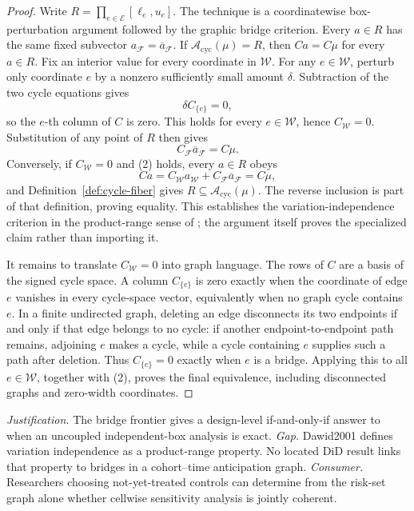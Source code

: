 \documentclass{article}
\begin{document}
\begin{proof}
Write \(R=\prod_{e\in\mathcal E}[\ell_e,u_e]\).  The technique is a coordinatewise box-perturbation argument followed by the graphic bridge criterion.  Every \(a\in R\) has the same fixed subvector \(a_{\mathcal F}=\overline a_{\mathcal F}\).  If \(\mathcal A_{\mathrm{cyc}}(\mu)=R\), then \(Ca=C\mu\) for every \(a\in R\).  Fix an interior value for every coordinate in \(\mathcal W\).  For any \(e\in\mathcal W\), perturb only coordinate \(e\) by a nonzero sufficiently small amount \(\delta\).  Subtraction of the two cycle equations gives
\[
 \delta C_{\{e\}}=0,
\]
so the \(e\)-th column of \(C\) is zero.  This holds for every \(e\in\mathcal W\), hence \(C_{\mathcal W}=0\).  Substitution of any point of \(R\) then gives
\[
 C_{\mathcal F}\overline a_{\mathcal F}=C\mu. \tag{2}
\]
Conversely, if \(C_{\mathcal W}=0\) and (2) holds, every \(a\in R\) obeys
\[
 Ca=C_{\mathcal W}a_{\mathcal W}+C_{\mathcal F}\overline a_{\mathcal F}=C\mu,
\]
and Definition~\ref{def:cycle-fiber} gives \(R\subseteq\mathcal A_{\mathrm{cyc}}(\mu)\).  The reverse inclusion is part of that definition, proving equality.  This establishes the variation-independence criterion in the product-range sense of \cite{Dawid2001}; the argument itself proves the specialized claim rather than importing it.

It remains to translate \(C_{\mathcal W}=0\) into graph language.  The rows of \(C\) are a basis of the signed cycle space.  A column \(C_{\{e\}}\) is zero exactly when the coordinate of edge \(e\) vanishes in every cycle-space vector, equivalently when no graph cycle contains \(e\).  In a finite undirected graph, deleting an edge disconnects its two endpoints if and only if that edge belongs to no cycle: if another endpoint-to-endpoint path remains, adjoining \(e\) makes a cycle, while a cycle containing \(e\) supplies such a path after deletion.  Thus \(C_{\{e\}}=0\) exactly when \(e\) is a bridge.  Applying this to all \(e\in\mathcal W\), together with (2), proves the final equivalence, including disconnected graphs and zero-width coordinates.
\end{proof}
\par\smallskip\noindent \textit{Justification.} The bridge frontier gives a design-level if-and-only-if answer to when an uncoupled independent-box analysis is exact. \textit{Gap.} Dawid2001 defines variation independence as a product-range property. No located DiD result links that property to bridges in a cohort--time anticipation graph. \textit{Consumer.} Researchers choosing not-yet-treated controls can determine from the risk-set graph alone whether cellwise sensitivity analysis is jointly coherent.
\end{document}
